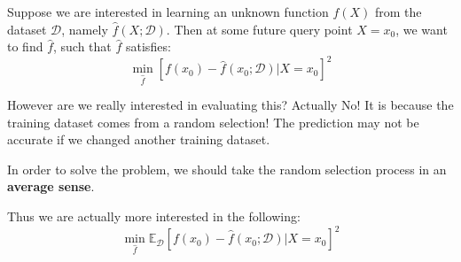 \documentclass{article}
\theoremstyle{MyNonumberplain}
\theoremstyle{break}
\newcommand{\ev}{\mathbb{E}}
\newcommand{\evd}{\ev_{\mathcal{D}}}
\theoremstyle{break}
\theoremstyle{break}
\theoremstyle{break}
\begin{document}
Suppose we are interested in learning an unknown function $f(X)$ from the dataset $\mathcal{D}$,
namely $\hat{f}(X;\mathcal{D})$. Then at some future query point $X=x_0$, we want to
find $\hat{f}$, such that $\hat{f}$ satisfies: $$\min_{\hat{f}}[f(x_0)-\hat{f}(x_0;\mathcal{D})|X=x_0]^2$$

However are we really interested in evaluating this? Actually No! It is because the 
training dataset comes from a random selection! The prediction may not be accurate
if we changed another training dataset.

In order to solve the problem, we should take the random selection process in an \textbf{average sense}. 

Thus we are actually more interested in the following: $$\min_{\hat{f}}\evd[f(x_0)-\hat{f}(x_0;\mathcal{D})|X=x_0]^2$$
\end{document}

